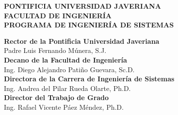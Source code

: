 \newpage
\thispagestyle{empty}
\begin{center}

    \large
    \textbf{PONTIFICIA UNIVERSIDAD JAVERIANA}\\
    \textbf{FACULTAD DE INGENIERÍA}\\
    \textbf{PROGRAMA DE INGENIERÍA DE SISTEMAS}\\

    \vspace{6cm}

    \textbf{Rector de la Pontificia Universidad Javeriana}\\
    \vspace{0.4cm}
    Padre Luis Fernando Múnera, S.J.\\

    \vspace{0.6cm}
    \textbf{Decano de la Facultad de Ingeniería}\\
    \vspace{0.4cm}
    Ing. Diego Alejandro Patiño Guevara, Sc.D.\\

    \vspace{0.6cm}
    \textbf{Directora de la Carrera de Ingeniería de Sistemas}\\
    \vspace{0.4cm}
    Ing. Andrea del Pilar Rueda Olarte, Ph.D.\\

    \vspace{0.6cm}
    \textbf{Director del Trabajo de Grado}\\
    \vspace{0.4cm}
    Ing. Rafael Vicente Páez Méndez, Ph.D.\\

\end{center}
\newpage
